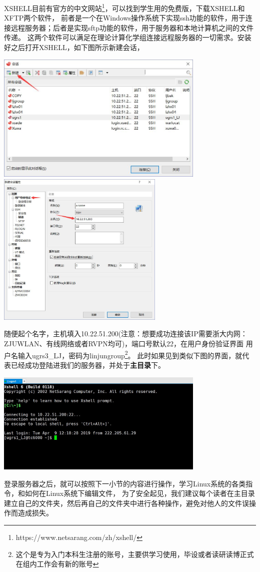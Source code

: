 \documentclass{article}
\numberwithin{equation}{section}
\begin{document}
    XSHELL目前有官方的中文网站\footnote{https://www.netsarang.com/zh/xshell/}，可以找到学生用的免费版，下载XSHELL和XFTP两个软件，
    前者是一个在Windows操作系统下实现ssh功能的软件，用于连接远程服务器；后者是实现sftp功能的软件，用于服务器和本地计算机之间的文件传递。
    这两个软件可以满足在理论计算化学组连接远程服务器的一切需求。安装好之后打开XSHELL，如下图所示新建会话，
    \begin{center}
      \includegraphics[width = 10cm]{fig/xshell1.jpg}
      \includegraphics[width = 8cm]{fig/xshell2.jpg}
    \end{center}
    随便起个名字，主机填入10.22.51.200(注意：想要成功连接该IP需要浙大内网：ZJUWLAN、有线网络或者RVPN均可)，端口号默认22，在用户身份验证界面
    用户名输入ugrs3\_LJ，密码为linjungroup\footnote{这个是专为入门本科生注册的账号，主要供学习使用，毕设或者读研读博正式在组内工作会有新的账号}。
    此时如果见到类似下图的界面，就代表已经成功登陆进我们的服务器，并处于\textbf{主目录}下。
    \begin{center}
      \includegraphics[width = 10cm]{fig/xshell3.jpg}
    \end{center}
    登录服务器之后，就可以按照下一小节的内容进行操作，学习Linux系统的各类指令，和如何在Linux系统下编辑文件，
    为了安全起见，我们建议每个读者在主目录建立自己的文件夹，然后再自己的文件夹中进行各种操作，避免对他人的文件误操作而造成损失。
\end{document}
